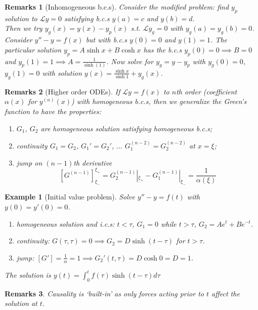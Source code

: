 \documentclass[a4paper]{article}
\newtheorem{remarks}{Remarks}[section]
\newtheorem{eg}{Example}[section]
\theoremstyle{new}
\begin{document}
\begin{remarks}[Inhomogeneous b.c.s]
Consider the modified problem: find $y_p$ solution to $\mathcal{L}y=0$ satisfying b.c.s $y(a)=c$ and $y(b)=d$.\\[5pt]
Then we try $y_g(x)=y(x)-y_p(x)$ s.t. $\mathcal{L}y_g=0$ with $y_g(a)=y_g(b)=0$. Consider $y''-y=f(x)$ but with b.c.s $y(0)=0$ and $y(1)=1$. The particular solution $y_p=A\sinh x+B\cosh x$ has the b.c.s $y_p(0)=0\implies B=0$ and $y_p(1)=1\implies A=\frac{1}{\sinh(1)}$. Now solve for $y_g=y-y_p$ with $y_g(0)=0$, $y_g(1)=0$ with solution $y(x)=\frac{\sinh x}{\sinh 1}+y_g(x)$.
\end{remarks}
\begin{remarks}[Higher order ODEs]
If $\mathcal{L}y=f(x)$ to $n$th order (coefficient $\alpha(x)$ for $y^{(n)}(x)$) with homogeneous b.c.s, then we generalize the Green's function to have the properties:
\begin{enumerate}
    \item $G_1$, $G_2$ are homogeneous solution satisfying homogeneous b.c.s;
    \item continuity $G_1=G_2$, $G_1'=G_2'$, $\dots$ $G_1^{(n-2)}=G_2^{(n-2)}$ at $x=\xi$;
    \item jump on $(n-1)$th derivative
    $$[G^{(n-1)}]_{\xi_-}^{\xi_+}=G_2^{(n-1)}|_{\xi_+}-G_1^{(n-1)}|_{\xi_-}=\frac{1}{\alpha(\xi)}$$
\end{enumerate}
\end{remarks}
\begin{eg}[Initial value problem]
Solve $y''-y=f(t)$ with $y(0)=y'(0)=0$.
\begin{enumerate}
    \item homogeneous solution and i.c.s: $t<\tau$, $G_1=0$ while $t>\tau$, $G_2=Ae^t+Be^{-t}$.
    \item continuity: $G(\tau,\tau)=0\implies G_2=D\sinh(t-\tau)$ for $t>\tau$.
    \item jump: $[G']=\frac{1}{\alpha}=1\implies G_2'(t,\tau)=D\cosh 0=D=1$.
\end{enumerate}
The solution is $y(t)=\int_0^tf(\tau)\sinh(t-\tau)d\tau$
\end{eg}
\begin{remarks}
Causality is `built-in' as only forces acting prior to $t$ affect the solution at $t$.
\end{remarks}
\end{document}

